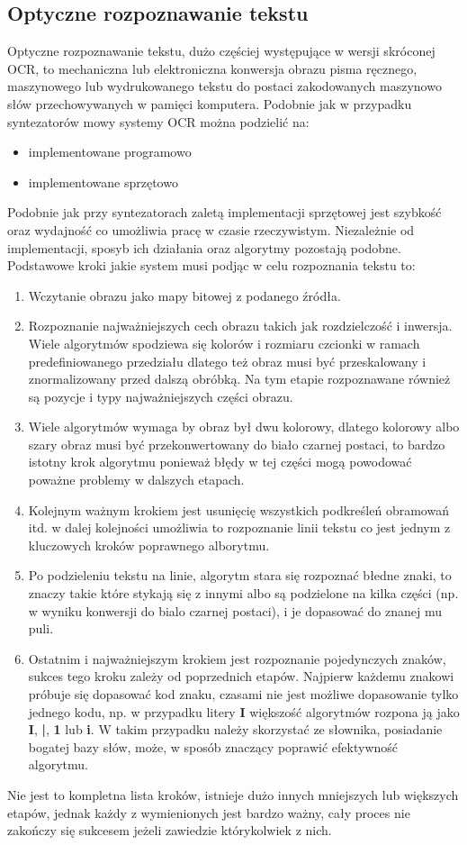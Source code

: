 \subsection{Optyczne rozpoznawanie tekstu}
Optyczne rozpoznawanie tekstu, dużo częściej występujące w wersji skróconej OCR, to mechaniczna lub elektroniczna konwersja obrazu pisma ręcznego, maszynowego lub wydrukowanego tekstu do postaci zakodowanych maszynowo słów przechowywanych w pamięci komputera. Podobnie jak w przypadku syntezatorów mowy systemy OCR można podzielić na:
\begin{itemize}
	\item implementowane programowo
	\item implementowane sprzętowo
\end{itemize}
Podobnie jak przy syntezatorach zaletą implementacji sprzętowej jest szybkość oraz wydajność co umożliwia pracę w czasie rzeczywistym. Niezależnie od implementacji, sposyb ich działania oraz algorytmy pozostają podobne. Podstawowe kroki jakie system musi podjąc w celu rozpoznania tekstu to:
\begin{enumerate}
	\item Wczytanie obrazu jako mapy bitowej z podanego źródła.
	\item Rozpoznanie najważniejszych cech obrazu takich jak rozdzielczość i inwersja. Wiele algorytmów spodziewa się kolorów i rozmiaru czcionki w ramach predefiniowanego przedziału dlatego też obraz musi być przeskalowany i znormalizowany przed dalszą obróbką. Na tym etapie rozpoznawane również są pozycje i typy najważniejszych części obrazu.
	\item Wiele algorytmów wymaga by obraz był dwu kolorowy, dlatego kolorowy albo szary obraz musi być przekonwertowany do biało czarnej postaci, to bardzo istotny krok algorytmu ponieważ błędy w tej części mogą powodować poważne problemy w dalszych etapach.
	\item Kolejnym ważnym krokiem jest usunięcię wszystkich podkreśleń obramowań itd. w dalej kolejności umożliwia to rozpoznanie linii tekstu co jest jednym z kluczowych kroków poprawnego alborytmu.
	\item Po podzieleniu tekstu na linie, algorytm stara się rozpoznać błedne znaki, to znaczy takie które stykają się z innymi albo są podzielone na kilka części (np. w wyniku konwersji do bialo czarnej postaci), i je dopasować do znanej mu puli.
	\item Ostatnim i najważniejszym krokiem jest rozpoznanie pojedynczych znaków, sukces tego kroku zależy od poprzednich etapów. Najpierw każdemu znakowi próbuje się dopasować kod znaku, czasami nie jest możliwe dopasowanie tylko jednego kodu, np. w przypadku litery \textbf{I} większość algorytmów rozpona ją jako \textbf{I}, \textbf{|}, \textbf{1} lub \textbf{i}. W takim przypadku należy skorzystać ze słownika, posiadanie bogatej bazy słów, może, w sposób znaczący poprawić efektywność algorytmu.
\end{enumerate}
Nie jest to kompletna lista kroków, istnieje dużo innych mniejszych lub większych etapów, jednak każdy z wymienionych jest bardzo ważny, cały proces nie zakończy się sukcesem jeżeli zawiedzie którykolwiek z nich. 
